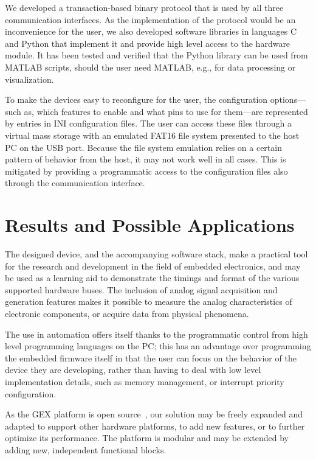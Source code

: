 We developed a transaction-based binary protocol that is used by all three communication interfaces. As the implementation of the protocol would be an inconvenience for the user, we also developed software libraries in languages C and Python that implement it and provide high level access to the hardware module. It has been tested and verified that the Python library can be used from MATLAB scripts, should the user need MATLAB, e.g., for data processing or visualization.

To make the devices easy to reconfigure for the user, the configuration options---such as, which features to enable and what pins to use for them---are represented by entries in INI configuration files. The user can access these files through a virtual mass storage with an emulated FAT16 file system presented to the host \gls{PC} on the \gls{USB} port. Because the file system emulation relies on a certain pattern of behavior from the host, it may not work well in all cases. This is mitigated by providing a programmatic access to the configuration files also through the communication interface. 

\section{Results and Possible Applications}

The designed device, and the accompanying software stack, make a practical tool for the research and development in the field of embedded electronics, and may be used as a learning aid to demonstrate the timings and format of the various supported hardware buses. The inclusion of analog signal acquisition and generation features makes it possible to measure the analog characteristics of electronic components, or acquire data from physical phenomena. 

The use in automation offers itself thanks to the programmatic control from high level programming languages on the \gls{PC}; this has an advantage over programming the embedded firmware itself in that the user can focus on the behavior of the device they are developing, rather than having to deal with low level implementation details, such as memory management, or interrupt priority configuration.

As the GEX platform is open source~\cite{gex-gh}, our solution may be freely expanded and adapted to support other hardware platforms, to add new features, or to further optimize its performance. The platform is modular and may be extended by adding new, independent functional blocks.

